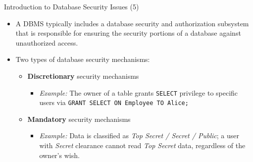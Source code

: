 \begin{frame}{Introduction to Database Security Issues (5)}
    \Large
    
    \begin{itemize}
        \vspace{-0.7cm}
        
        \item A DBMS typically includes a database security and authorization subsystem that is responsible for ensuring the security portions of a database against unauthorized access.
        
        \vspace{0.4cm}
        
        \item Two types of database security mechanisms:
        \vspace{0.2cm}
        
        \begin{itemize}
            \large
            \setlength{\itemsep}{0.3cm}
            
            \item \textbf{Discretionary} security mechanisms
            \begin{itemize}
                \normalsize
                \item \textit{Example:} The owner of a table grants \texttt{SELECT} privilege to specific users via \texttt{GRANT SELECT ON Employee TO Alice;}
            \end{itemize}
            
            \item \textbf{Mandatory} security mechanisms
            \begin{itemize}
                \normalsize
                \item \textit{Example:} Data is classified as \textit{Top Secret / Secret / Public}; a user with \textit{Secret} clearance cannot read \textit{Top Secret} data, regardless of the owner's wish.
            \end{itemize}
        \end{itemize}
        
    \end{itemize}
\end{frame}

